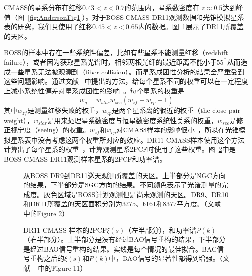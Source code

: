 CMASS的星系分布在红移$0.43 < z < 0.7$的范围内，星系数密度在 $z \approx 0.5$达到峰值（图~\ref{fig:AndersonFig1}）。对于BOSS CMASS DR11观测数据和光锥模拟星系表的研究，我们只使用了红移$0.45 < z < 0.65$内的数据。图~\ref{fig:footprints}展示了DR11所覆盖的天区。

BOSS的样本中存在一些系统性偏差，比如有些星系不能测量红移（redshift failure），或者因为获取星系光谱时，相邻两根光纤的最近距离不能小于$55^{\prime\prime}$从而造成一些星系无法被观测到（fiber collision）。而星系成团性分析的结果会严重受到这些问题影响。通过文献 ~中提出的方法，给每个星系不同的权重可以在一定程度上减小系统性偏差对星系成团性的影响~\cite{Ross2012,Chuang2016}。每个星系的权重是
\begin{equation}
w_g = w_{star} w_{see} (w_{zf} + w_{cp} - 1)
\label{EQ:weight}
\end{equation}
其中$w_{zf}$是测量红移失败的权重，$w_{cp}$是两个星系离的很近的权重（the close pair weight），$w_{star}$是用来处理星系数密度与恒星数密度系统性关系的权重，$w_{see}$是修正视宁度（seeing）的权重。$w_{zf}$和$w_{cp}$对CMASS样本的影响很小~\cite{Ross2012}，所以在光锥模拟星系表中没有考虑这两个权重所对应的效应。DR11 CMASS样本使用这个方法计算出了每个星系的权重~\cite{Anderson2014441}，计算观测星系2PCF时使用了这些权重。图~\ref{fig:CMASSpkxi}中是BOSS CMASS DR11观测样本星系的2PCF和功率谱。

\begin{figure}
\centering
{}
\caption{ 从BOSS DR9到DR11巡天观测所覆盖的天区。上半部分是NGC方向的结果，下半部分是SGC方向的结果。不同颜色表示了光谱测量的完成度。灰色区域是BOSS计划观测但是尚未观测的天区。DR9、DR10和DR11所覆盖的天区面积分别为3275、6161和8377平方度。（文献 ~ 中的Figure 2）}
\label{fig:footprints}
\end{figure}

\begin{figure}
\centering
{}
\caption{DR11 CMASS 样本的2PCF$\xi(s)$（左半部分），和功率谱$P(k)$（右半部分）。上半部分是没有经过BAO信号重构的结果，下半部分是经过BAO信号重构的结果。实线是每个情况的最佳拟合。BAO信号重构之后的$\xi(s)$和$P(k)$中，BAO信号的显著性都得到增强。（文献 ~ 中的Figure 11）}
\label{fig:CMASSpkxi}
\end{figure}

